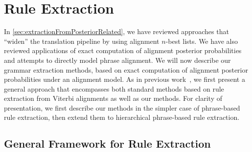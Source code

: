 \section{Rule Extraction}
\label{sec:extractionFromPosteriorsExtraction}

In \autoref{sec:extractionFromPosteriorRelated}, we have reviewed approaches
that ``widen'' the translation pipeline by using alignment $n$-best lists.
We have also reviewed applications of exact computation of alignment posterior
probabilities and attempts to directly model phrase alignment. We will now
describe our grammar extraction methods, based on exact computation of
alignment posterior probabilities under an alignment model.
As in previous work~\citep{hopkins-langmead-vo:2011:WMT},
we first present a general approach that encompasses both standard methods
based on rule extraction from Viterbi alignments as well as our methods.
For clarity of presentation, we first describe our methods in the simpler case
of phrase-based rule extraction, then extend them to hierarchical phrase-based
rule extraction.

\subsection{General Framework for Rule Extraction}
\label{sec:extractionFromPosteriorsExtractionGeneralApproach}

